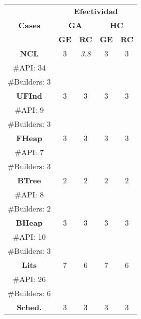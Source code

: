 \begin{table}[H]
\centering
\label{tab:t1}
\scriptsize
\begin{tabular}{c ccccc}
\midrule
\multicolumn{2}{c}{\multirow{3}{*}{\textbf{Cases}}} & \multicolumn{4}{c}{\textbf{Efectividad}} \\
\cline{3-6}
\multicolumn{2}{c}{} & \multicolumn{2}{c}{\textbf{GA}} & \multicolumn{2}{c}{\textbf{HC}}  \\
\multicolumn{2}{c}{} & \textbf{\tiny{GE}} & \textbf{\tiny{RC}} & \textbf{\tiny{GE}} & \textbf{\tiny{RC}}  \\
\midrule
\multicolumn{2}{c}{\textbf{NCL}} & 3  &   \cellcolor{gray!25} \emph{3.8} & 3 &  3 \\
\multicolumn{2}{c}{\tiny \#API: 34} &  &   & &    \\
\multicolumn{2}{c}{\tiny \#Builders: 3} &  &   & &    \\

\midrule
\multicolumn{2}{c}{\textbf{UFInd}}& 3 & 3  & 3  & 3      \\
\multicolumn{2}{c}{\tiny \#API: 9} &  &   & &   \\
\multicolumn{2}{c}{\tiny \#Builders: 3} &  &   & &    \\
\midrule

\multicolumn{2}{c}{\textbf{FHeap}}& 3 & 3  &  3 &  3   \\
\multicolumn{2}{c}{\tiny \#API: 7} &  &   & &    \\
\multicolumn{2}{c}{\tiny \#Builders: 3} &  &   & &    \\
\midrule
\multicolumn{2}{c}{\textbf{BTree}} & 2 & 2  &  2 &  2   \\
\multicolumn{2}{c}{\tiny \#API: 8} &  &   & &    \\
\multicolumn{2}{c}{\tiny \#Builders: 2} &  &   & &    \\
\midrule
\multicolumn{2}{c}{\textbf{BHeap}}& 3 & 3 &  3 &  3    \\
\multicolumn{2}{c}{\tiny \#API: 10} &  &   & &   \\
\multicolumn{2}{c}{\tiny \#Builders: 3} &  &   & &   \\
\midrule
\multicolumn{2}{c}{\textbf{Lits}} &  7 & 6 & 7 &  6    \\
\multicolumn{2}{c}{\tiny \#API: 26} &  &   & &    \\
\multicolumn{2}{c}{\tiny \#Builders: 6} &  &   & &   \\
\midrule
\multicolumn{2}{c}{\textbf{Sched.}} &  3 & 3   & 3  &  3 \\


\end{tabular}
\end{table}
